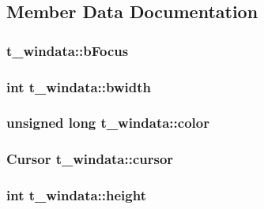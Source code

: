 \subsection{\-Member \-Data \-Documentation}
\hypertarget{structt__windata_aedabb702c7a45f82083e655b5d6c4906}{
\subsubsection[{b\-Focus}]{ {\bf t\-\_\-windata\-::b\-Focus}}}\label{structt__windata_aedabb702c7a45f82083e655b5d6c4906}
\hypertarget{structt__windata_a92f28bebdbeb62203cd3cbe67a10a4bc}{
\subsubsection[{bwidth}]{\setlength{\rightskip}{0pt plus 5cm}int {\bf t\-\_\-windata\-::bwidth}}}\label{structt__windata_a92f28bebdbeb62203cd3cbe67a10a4bc}
\hypertarget{structt__windata_a499d227d8408d2c5dbbb926f69e43b2d}{
\subsubsection[{color}]{\setlength{\rightskip}{0pt plus 5cm}unsigned long {\bf t\-\_\-windata\-::color}}}\label{structt__windata_a499d227d8408d2c5dbbb926f69e43b2d}
\hypertarget{structt__windata_a864597a200e5457dc5cc78455e255960}{
\subsubsection[{cursor}]{\setlength{\rightskip}{0pt plus 5cm}\-Cursor {\bf t\-\_\-windata\-::cursor}}}\label{structt__windata_a864597a200e5457dc5cc78455e255960}
\hypertarget{structt__windata_a4643232d93147981132a47af8d8b0387}{
\subsubsection[{height}]{\setlength{\rightskip}{0pt plus 5cm}int {\bf t\-\_\-windata\-::height}}}\label{structt__windata_a4643232d93147981132a47af8d8b0387}
